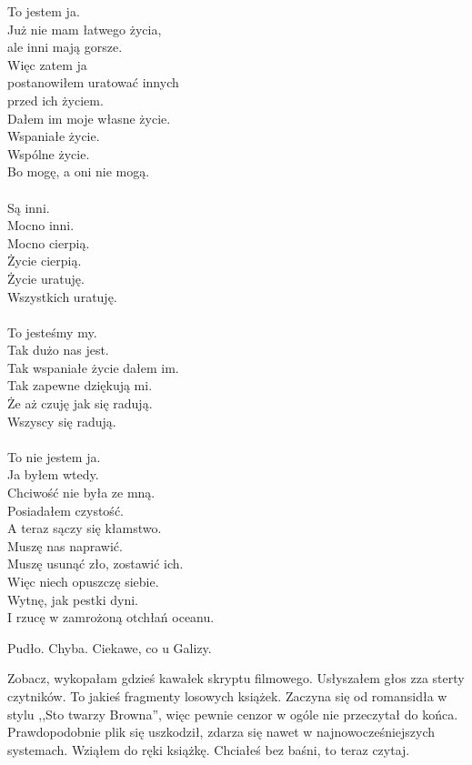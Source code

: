 \begin{poem}
	To jestem ja. \\
	Już nie mam łatwego życia, \\
	ale inni mają gorsze. \\
	Więc zatem ja \\
	postanowiłem uratować innych \\
	przed ich życiem. \\
	Dałem im moje własne życie. \\
	Wspaniałe życie. \\
	Wspólne życie. \\
	Bo mogę, a oni nie mogą. \\
	\\
	Są inni. \\
	Mocno inni. \\
	Mocno cierpią. \\
	Życie cierpią. \\
	Życie uratuję. \\
	Wszystkich uratuję. \\
	\\
	To jesteśmy my. \\
	Tak dużo nas jest. \\
	Tak wspaniałe życie dałem im. \\
	Tak zapewne dziękują mi. \\
	Że aż czuję jak się radują. \\
	Wszyscy się radują. \\
	\\
	To nie jestem ja. \\
	Ja byłem wtedy. \\
	Chciwość nie była ze mną. \\
	Posiadałem czystość. \\
	A teraz sączy się kłamstwo. \\
	Muszę nas naprawić. \\
	Muszę usunąć zło, zostawić ich. \\
	Więc niech opuszczę siebie. \\
	Wytnę, jak pestki dyni. \\
	I rzucę w zamrożoną otchłań oceanu.
\end{poem}

Pudło. Chyba. Ciekawe, co u Galizy.

\begin{dialogue}
	\ds{} Zobacz, wykopałam gdzieś kawałek skryptu filmowego. \dm{} Usłyszałem głos zza sterty czytników. \dm{} To jakieś fragmenty losowych książek.
	Zaczyna się od romansidła w stylu ,,Sto twarzy Browna'', więc pewnie cenzor w ogóle nie przeczytał do końca.
	\ds{} Prawdopodobnie plik się uszkodził, zdarza się nawet w najnowocześniejszych systemach. \dm{} Wziąłem do ręki książkę.
	\ds{} Chciałeś bez baśni, to teraz czytaj.
\end{dialogue}

